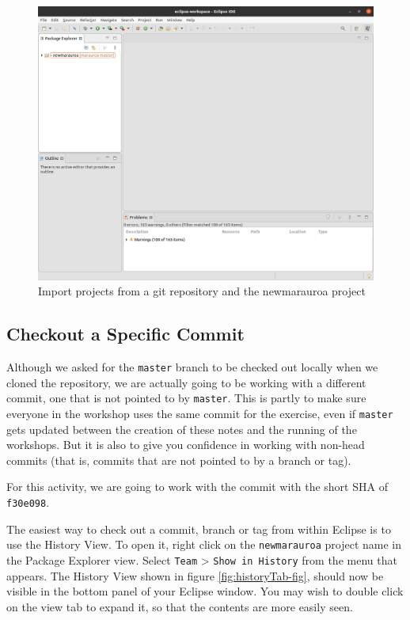 \documentclass[
]{book}
\begin{document}
\begin{figure}

{\centering \includegraphics[width=1\linewidth]{images/1.4finallyImportedProject} 

}

\caption{Import projects from a git repository and the newmarauroa project}\label{fig:finallyImportedProject-fig}
\end{figure}

\hypertarget{checkout-a-specific-commit}{%
\subsection{Checkout a Specific Commit}\label{checkout-a-specific-commit}}

Although we asked for the \texttt{master} branch to be checked out locally when we cloned the repository, we are actually going to be working with a different commit, one that is not pointed to by \texttt{master}. This is partly to make sure everyone in the workshop uses the same commit for the exercise, even if \texttt{master} gets updated between the creation of these notes and the running of the workshops. But it is also to give you confidence in working with non-head commits (that is, commits that are not pointed to by a branch or tag).

For this activity, we are going to work with the commit with the short SHA of \texttt{f30e098}.

The easiest way to check out a commit, branch or tag from within Eclipse is to use the History View. To open it, right click on the \texttt{newmarauroa} project name in the Package Explorer view. Select \texttt{Team} \textgreater{} \texttt{Show\ in\ History} from the menu that appears. The History View shown in figure \ref{fig:historyTab-fig}, should now be visible in the bottom panel of your Eclipse window. You may wish to double click on the view tab to expand it, so that the contents are more easily seen.
\end{document}
